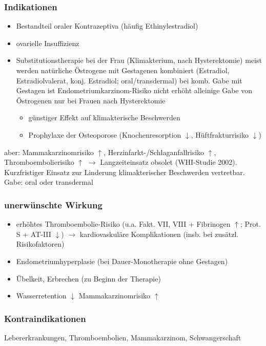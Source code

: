 \documentclass[10pt,a4paper]{report}
\begin{document}
\subsubsection{Indikationen} %
\label{par:indikationen}
\begin{itemize}
	\item Bestandteil oraler Kontrazeptiva (häufig Ethinylestradiol)
	\item ovarielle Insuffizienz
	\item Substitutionstherapie bei der Frau (Klimakterium, nach Hysterektomie) meist werden natürliche Östrogene mit Gestagenen kombiniert (Estradiol, Estradiolvalerat, konj. Estradiol; oral/transdermal) bei komb. Gabe mit Gestagen ist Endometriumkarzinom-Risiko nicht erhöht alleinige Gabe von Östrogenen nur bei Frauen nach Hysterektomie 
	\begin{itemize}
		\item günstiger Effekt auf klimakterische Beschwerden
		\item Prophylaxe der Osteoporose (Knochenresorption $\downarrow$, Hüftfrakturrisiko $\downarrow$)
	\end{itemize}
\end{itemize}
aber: Mammakarzinomrisiko $\uparrow$, Herzinfarkt-/Schlaganfallrisiko $\uparrow$, Thromboembolierisiko $\uparrow$ $\rightarrow$ Langzeiteinsatz obsolet (WHI-Studie 2002). Kurzfristiger Einsatz zur Linderung klimakterischer Beschwerden vertretbar.\\
Gabe: oral oder transdermal
\subsubsection{unerwünschte Wirkung} %
\label{par:unerw_nschte_wirkung}
\begin{itemize}
	\item erhöhtes Thromboembolie-Risiko (u.a. Fakt. VII, VIII + Fibrinogen $\uparrow$; Prot. S + AT-III $\downarrow$) $\rightarrow$ kardiovaskuläre Komplikationen (insb. bei zusätzl. Risikofaktoren)
	\item Endometriumhyperplasie (bei Dauer-Monotherapie ohne Gestagen)
	\item Übelkeit, Erbrechen (zu Beginn der Therapie)
	\item Wasserretention  $\downarrow$ Mammakarzinomrisiko $\uparrow$ 
\end{itemize}
\subsubsection{Kontraindikationen} %
\label{par:kontraindikationen}
Lebererkrankungen, Thromboembolien, Mammakarzinom, Schwangerschaft
\end{document}
